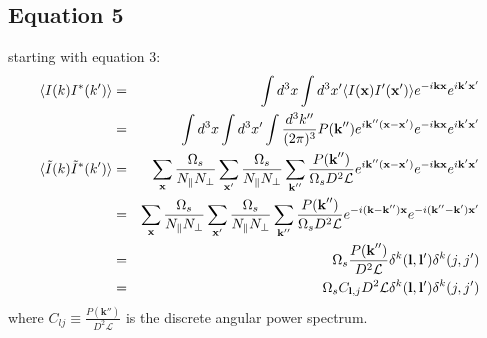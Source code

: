 \documentclass[12pt]{article}
\def\l{{\bf l}}
\numberwithin{equation}{section}
\begin{document}
\subsection{Equation 5}
starting with equation 3:
\begin{eqnarray}
	\langle I(k) I^*(k')\rangle  &=& \int d^3x \int d^3 x'  \langle I(\textbf{x}) I'(\textbf{x}') \rangle e^{- i \textbf{k} \textbf{x}} e^{i \textbf{k}' \textbf{x}'}  \\
	&=& \int d^3x \int d^3 x' \int \frac{d^3 k''}{(2\pi)^3} P(\textbf{k}'') e^{i\textbf{k}'' (\textbf{x} - \textbf{x}')} e^{- i \textbf{k} \textbf{x}} e^{i \textbf{k}' \textbf{x}'}  \\
	\langle \tilde{I}(k) \tilde{I}^*(k')\rangle &=&  \sum_\textbf{x} \frac{\Omega_s}{N_\parallel N_\perp} \sum_{\textbf{x}'} \frac{\Omega_s}{N_\parallel N_\perp} \sum_{\textbf{k}''} \frac{P(\textbf{k}'')}{\Omega_s D^2 \mathcal{L}}  e^{i \textbf{k}''(\textbf{x} - \textbf{x}')} e^{- i \textbf{k} \textbf{x}} e^{i \textbf{k}' \textbf{x}'} \\
	&=& \sum_\textbf{x} \frac{\Omega_s}{N_\parallel N_\perp} \sum_{\textbf{x}'} \frac{\Omega_s}{N_\parallel N_\perp} \sum_{\textbf{k}''} \frac{P(\textbf{k}'')}{\Omega_s D^2 \mathcal{L}}  e^{ -i (\textbf{k} - \textbf{k}'')\textbf{x}} e^{-i (\textbf{k}'' - \textbf{k}') \textbf{x}'} \\
	&=&  \Omega_s \frac{P(\textbf{k}'')}{D^2 \mathcal{L}}  \delta^k(\l,\l') \delta^k(j,j')\\
	&=&  \Omega_s C_{\l, j}{D^2 \mathcal{L}}  \delta^k(\l,\l') \delta^k(j,j')
\end{eqnarray}
where $ C_{lj} \equiv \frac{P(\textbf{k}'')}{D^2 \mathcal{L}}$ is the discrete angular power spectrum.
\end{document}
